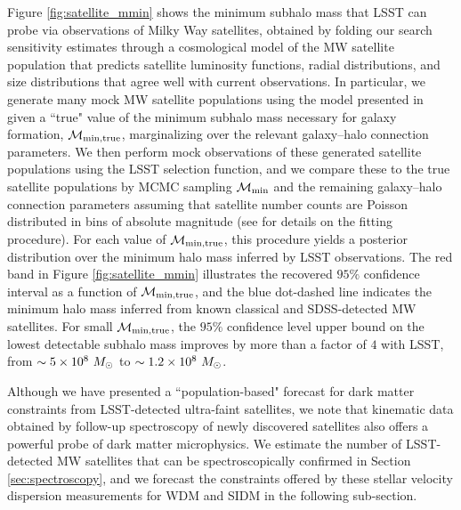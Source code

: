 Figure \ref{fig:satellite_mmin} shows the minimum subhalo mass that LSST can probe via observations of Milky Way satellites, obtained by folding our search sensitivity estimates through a cosmological model of the MW satellite population that predicts satellite luminosity functions, radial distributions, and size distributions that agree well with current observations. In particular, we generate many mock MW satellite populations using the model presented in \cite{Nadler:2018} given a ``true" value of the minimum subhalo mass necessary for galaxy formation, $\mathcal{M}_{\rm{min,true}}$, marginalizing over the relevant galaxy--halo connection parameters. We then perform mock observations of these generated satellite populations using the LSST selection function, and we compare these to the true satellite populations by MCMC sampling $\mathcal{M}_{\rm{min}}$ and the remaining galaxy--halo connection parameters assuming that satellite number counts are Poisson distributed in bins of absolute magnitude (see \citealt{Nadler:2018} for details on the fitting procedure). For each value of $\mathcal{M}_{\rm{min,true}}$, this procedure yields a posterior distribution over the minimum halo mass inferred by LSST observations. The red band in Figure \ref{fig:satellite_mmin} illustrates the recovered $95\%$ confidence interval as a function of $\mathcal{M}_{\rm{min,true}}$, and the blue dot-dashed line indicates the minimum halo mass inferred from known classical and SDSS-detected MW satellites. %
For small $\mathcal{M}_{\rm{min,true}}$, the $95\%$ confidence level upper bound on the lowest detectable subhalo mass improves by more than a factor of $4$ with LSST, from $\sim 5 \times 10^{8}\ \Msun$ to $\sim 1.2 \times 10^{8}\ \Msun$.

Although we have presented a ``population-based" forecast for dark matter constraints from LSST-detected ultra-faint satellites, we note that kinematic data obtained by follow-up spectroscopy of newly discovered satellites also offers a powerful probe of dark matter microphysics. We estimate the number of LSST-detected MW satellites that can be spectroscopically confirmed in Section \ref{sec:spectroscopy}, and we forecast the constraints offered by these stellar velocity dispersion measurements for WDM and SIDM in the following sub-section.

